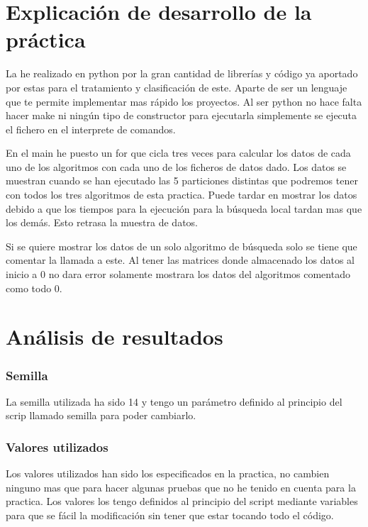 \documentclass[titlepage]{article}
\begin{document}
	
	
	
	
	\section{Explicación de desarrollo de la práctica}
	La he realizado en python por la gran cantidad de librerías y código ya aportado por estas para el tratamiento y clasificación de este.
	Aparte de ser un lenguaje que te permite implementar mas rápido los proyectos.
	Al ser python no hace falta hacer make ni ningún tipo de constructor para ejecutarla simplemente se ejecuta el fichero en el interprete de comandos.
	
	En el main he puesto un for que cicla tres veces para calcular los datos de cada uno de los algoritmos con cada uno de los ficheros de datos dado. Los datos se muestran cuando se han ejecutado las 5 particiones distintas que podremos tener con todos los tres algoritmos de esta practica. Puede tardar en mostrar los datos debido a que los tiempos para la ejecución para la búsqueda local tardan mas que los demás. Esto retrasa la muestra de datos.
	
	Si se quiere mostrar los datos de un solo algoritmo de búsqueda solo se tiene que comentar la llamada a este. Al tener las matrices donde almacenado los datos al inicio a 0 no dara error solamente mostrara los datos del algoritmos comentado como todo 0.
	\section{Análisis de resultados}
	\subsubsection{Semilla}
	La semilla utilizada ha sido 14 y tengo un parámetro definido al principio del scrip llamado semilla para poder cambiarlo.
	
	\subsubsection{Valores utilizados}	
	Los valores utilizados han sido los especificados en la practica, no cambien ninguno mas que para hacer algunas pruebas que no he tenido en cuenta para la practica. Los valores los tengo definidos al principio del script mediante variables para que se fácil la modificación sin tener que estar tocando todo el código.
	
\end{document}
